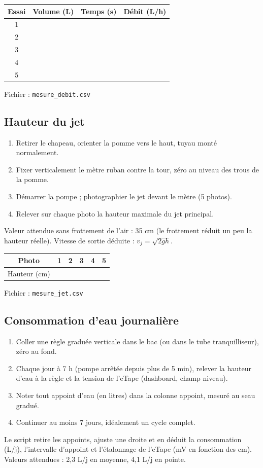 \documentclass[11pt,a4paper]{article}
\begin{document}
\begin{center}
\begin{tabular}{|c|c|c|c|}
\hline
Essai & Volume (L) & Temps (s) & Débit (L/h) \\ \hline
1 & & & \\ \hline 2 & & & \\ \hline 3 & & & \\ \hline 4 & & & \\ \hline 5 & & & \\ \hline
\end{tabular}
\qquad Fichier : \texttt{mesure\_debit.csv}
\end{center}

\subsection{Hauteur du jet}
\begin{enumerate}
  \item Retirer le chapeau, orienter la pomme vers le haut, tuyau monté normalement.
  \item Fixer verticalement le mètre ruban contre la tour, zéro au niveau des trous de la pomme.
  \item Démarrer la pompe ; photographier le jet devant le mètre (5 photos).
  \item Relever sur chaque photo la hauteur maximale du jet principal.
\end{enumerate}
Valeur attendue sans frottement de l'air : 35 cm (le frottement réduit un peu la hauteur réelle). Vitesse de sortie déduite : $v_j = \sqrt{2 g h}$.

\begin{center}
\begin{tabular}{|c|c|c|c|c|c|}
\hline
Photo & 1 & 2 & 3 & 4 & 5 \\ \hline
Hauteur (cm) & & & & & \\ \hline
\end{tabular}
\qquad Fichier : \texttt{mesure\_jet.csv}
\end{center}

\subsection{Consommation d'eau journalière}
\begin{enumerate}
  \item Coller une règle graduée verticale dans le bac (ou dans le tube tranquilliseur), zéro au fond.
  \item Chaque jour à 7 h (pompe arrêtée depuis plus de 5 min), relever la hauteur d'eau à la règle et la tension de l'eTape (dashboard, champ niveau).
  \item Noter tout appoint d'eau (en litres) dans la colonne \og appoint\fg{}, mesuré au seau gradué.
  \item Continuer au moins 7 jours, idéalement un cycle complet.
\end{enumerate}
Le script retire les appoints, ajuste une droite et en déduit la consommation (L/j), l'intervalle d'appoint et l'étalonnage de l'eTape (mV en fonction des cm). Valeurs attendues : 2,3 L/j en moyenne, 4,1 L/j en pointe.
\end{document}
